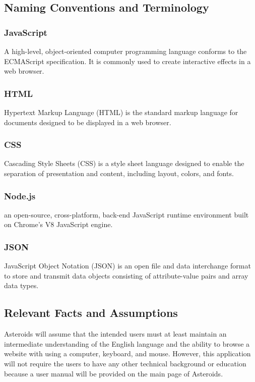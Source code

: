 \documentclass[12pt, titlepage]{article}
\begin{document}
\subsection{Naming Conventions and Terminology}

\subsubsection{JavaScript}
A high-level, object-oriented computer programming language conforms to the ECMAScript specification. It is commonly used to create interactive effects in a web browser. 

\subsubsection{HTML}
Hypertext Markup Language (HTML) is the standard markup language for documents designed to be displayed in a web browser.

\subsubsection{CSS}
Cascading Style Sheets (CSS) is a style sheet language designed to enable the separation of presentation and content, including layout, colors, and fonts. 

\subsubsection{Node.js}
an open-source, cross-platform, back-end JavaScript runtime environment built on Chrome’s V8 JavaScript engine. 

\subsubsection{JSON}
JavaScript Object Notation (JSON) is an open file and data interchange format to store and transmit data objects consisting of attribute-value pairs and array data types.  


\subsection{Relevant Facts and Assumptions}

Asteroids will assume that the intended users must at least maintain an intermediate understanding of the English language and the ability to browse a website with using a computer, keyboard, and mouse. However, this application will not require the users to have any other technical background or education because a user manual will be provided on the main page of Asteroids.  
\end{document}
